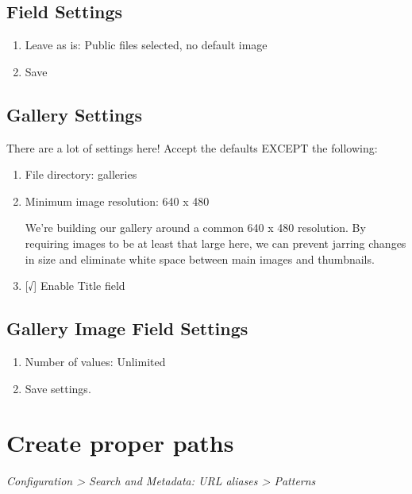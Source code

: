\documentclass[letterpaper,10pt,english]{sphinxmanual}
\begin{document}
\subsection{Field Settings}
\label{slideshows:field-settings}\begin{enumerate}
\item {} 
Leave as is: Public files selected, no default image

\item {} 
Save

\end{enumerate}


\subsection{Gallery Settings}
\label{slideshows:gallery-settings}
There are a lot of settings here! Accept the defaults EXCEPT the following:
\begin{enumerate}
\item {} 
File directory: galleries

\item {} 
Minimum image resolution: 640 x 480

We’re building our gallery around a common 640 x 480 resolution. By requiring images to be at least that large here, we can prevent jarring changes in size and eliminate white space between main images and thumbnails.

\item {} 
{[}√{]} Enable Title field

\end{enumerate}


\subsection{Gallery Image Field Settings}
\label{slideshows:gallery-image-field-settings}\begin{enumerate}
\item {} 
Number of values: Unlimited

\item {} 
Save settings.

\end{enumerate}


\section{Create proper paths}
\label{slideshows:create-proper-paths}
\emph{Configuration \textgreater{} Search and Metadata: URL aliases \textgreater{} Patterns}
\end{document}

